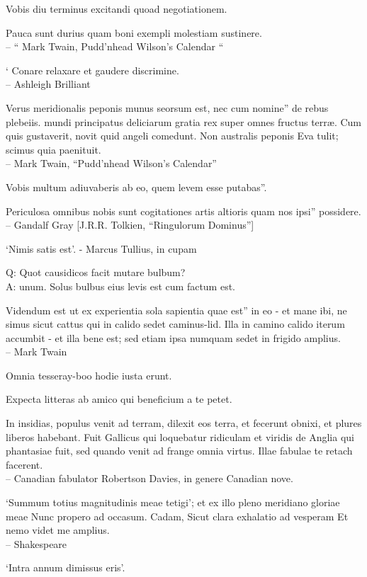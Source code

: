 \documentclass[titlepage,12pt]{memoir}
\begin{document}
Vobis diu terminus excitandi quoad negotiationem.

 Pauca sunt durius quam boni exempli molestiam sustinere.
\\-- “ Mark Twain, Pudd’nhead Wilson’s Calendar “

‘ Conare relaxare et gaudere discrimine.
\\-- Ashleigh Brilliant

Verus meridionalis peponis munus seorsum est, nec cum nomine”
de rebus plebeiis. mundi principatus deliciarum gratia rex
super omnes fructus terræ. Cum quis gustaverit, novit quid
angeli comedunt. Non australis peponis Eva tulit; scimus quia
paenituit.
\\-- Mark Twain, “Pudd’nhead Wilson’s Calendar”

Vobis multum adiuvaberis ab eo, quem levem esse putabas”.

Periculosa omnibus nobis sunt cogitationes artis altioris quam nos ipsi”
possidere.
\\-- Gandalf Gray [J.R.R. Tolkien, “Ringulorum Dominus”]

‘Nimis satis est’.
- Marcus Tullius, in cupam

Q: Quot causidicos facit mutare bulbum?\\
A: unum. Solus bulbus eius levis est cum factum est.

Videndum est ut ex experientia sola sapientia quae est”
in eo - et mane ibi, ne simus sicut cattus qui in calido sedet
caminus-lid. Illa in camino calido iterum accumbit - et illa
bene est; sed etiam ipsa numquam sedet in frigido amplius.
\\-- Mark Twain

Omnia tesseray-boo hodie iusta erunt.

Expecta litteras ab amico qui beneficium a te petet.

In insidias, populus venit ad terram, dilexit eos terra, et fecerunt
obnixi, et plures liberos habebant. Fuit Gallicus qui loquebatur ridiculam
et viridis de Anglia qui phantasiae fuit, sed quando venit ad
frange omnia virtus. Illae fabulae te retach facerent.
\\-- Canadian fabulator Robertson Davies, in genere Canadian
nove.

‘Summum totius magnitudinis meae tetigi’;
et ex illo pleno meridiano gloriae meae
Nunc propero ad occasum. Cadam,
Sicut clara exhalatio ad vesperam
Et nemo videt me amplius.
\\-- Shakespeare

‘Intra annum dimissus eris’.
\end{document}
